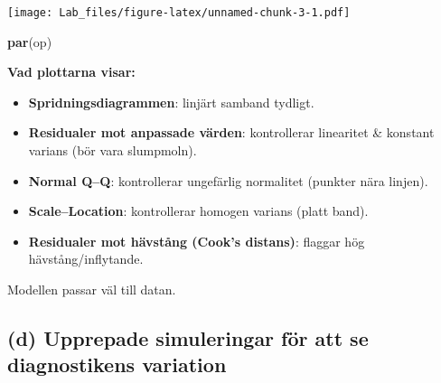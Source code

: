 \documentclass[
  11pt,
]{article}
\newenvironment{Shaded}{\begin{snugshade}}{\end{snugshade}}
\newcommand{\FunctionTok}[1]{\textcolor[rgb]{0.13,0.29,0.53}{\textbf{#1}}}
\newcommand{\NormalTok}[1]{#1}
\providecommand{\tightlist}{%
  \setlength{\itemsep}{0pt}\setlength{\parskip}{0pt}}
\begin{document}
\texttt{[image: Lab\_files/figure-latex/unnamed-chunk-3-1.pdf]}

\begin{Shaded}
\begin{Highlighting}[]
\FunctionTok{par}\NormalTok{(op)}
\end{Highlighting}
\end{Shaded}

\textbf{Vad plottarna visar:}

\begin{itemize}
\tightlist
\item
  \textbf{Spridningsdiagrammen}: linjärt samband tydligt.
\item
  \textbf{Residualer mot anpassade värden}: kontrollerar linearitet \&
  konstant varians (bör vara slumpmoln).
\item
  \textbf{Normal Q--Q}: kontrollerar ungefärlig normalitet (punkter nära
  linjen).
\item
  \textbf{Scale--Location}: kontrollerar homogen varians (platt band).
\item
  \textbf{Residualer mot hävstång (Cook's distans)}: flaggar hög
  hävstång/inflytande.
\end{itemize}

Modellen passar väl till datan.

\subsection{(d) Upprepade simuleringar för att se diagnostikens
variation}\label{d-upprepade-simuleringar-fuxf6r-att-se-diagnostikens-variation}
\end{document}
